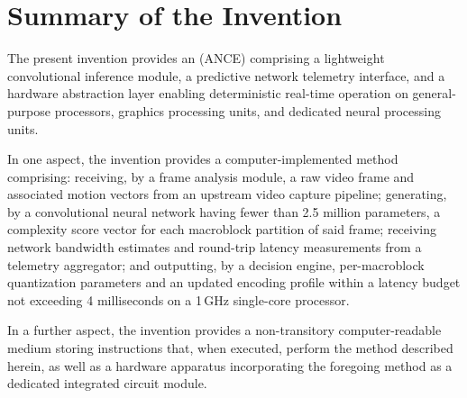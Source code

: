 \section{Summary of the Invention}\label{sec:summary}

The present invention provides an  (ANCE)
comprising a lightweight convolutional inference module, a predictive network telemetry
interface, and a hardware abstraction layer enabling deterministic real-time operation
on general-purpose processors, graphics processing units, and dedicated neural
processing units.

In one aspect, the invention provides a computer-implemented method comprising:
receiving, by a frame analysis module, a raw video frame and associated motion vectors
from an upstream video capture pipeline; generating, by a convolutional neural network
having fewer than 2.5 million parameters, a complexity score vector for each
macroblock partition of said frame; receiving network bandwidth estimates and round-trip
latency measurements from a telemetry aggregator; and outputting, by a decision engine,
per-macroblock quantization parameters and an updated encoding profile within a latency
budget not exceeding 4 milliseconds on a 1\,GHz single-core processor.

In a further aspect, the invention provides a non-transitory computer-readable medium
storing instructions that, when executed, perform the method described herein, as well
as a hardware apparatus incorporating the foregoing method as a dedicated integrated
circuit module.

